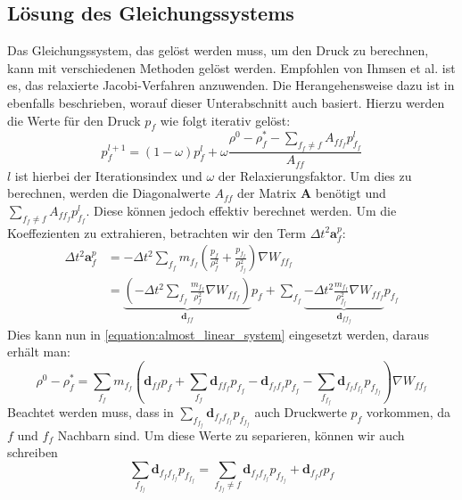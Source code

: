 \documentclass[11pt,
a4paper,
parskip=half, %
BCOR=10mm, %
english,
ngerman]{scrreprt}
\begin{document}
\subsection{Lösung des Gleichungssystems}
Das Gleichungssystem, das gelöst werden muss, um den Druck zu berechnen, kann mit verschiedenen Methoden gelöst werden.
Empfohlen von Ihmsen et al. \cite{ihmsen_implicit_2014} ist es, das relaxierte Jacobi-Verfahren anzuwenden.
Die Herangehensweise dazu ist in \cite{ihmsen_implicit_2014} ebenfalls beschrieben, worauf dieser Unterabschnitt auch basiert.
Hierzu werden die Werte für den Druck $p_f$ wie folgt iterativ gelöst:
\begin{equation}
    \label{equation:iterative_pressure_update}
    p_f^{l+1} = (1 - \omega) p_f^l + \omega \frac{\rho^0 - \rho_f^* - \sum_{f_f \neq f} A_{ff_f} p_{f_f}^l}{A_{ff}}
\end{equation}
$l$ ist hierbei der Iterationsindex und $\omega$ der Relaxierungsfaktor.
Um dies zu berechnen, werden die Diagonalwerte $A_{ff}$ der Matrix $\textbf{A}$ benötigt und $\sum_{f_f \neq f} A_{ff_f} p_{f_f}^l$.
Diese können jedoch effektiv berechnet werden.
Um die Koeffezienten zu extrahieren, betrachten wir den Term $\Delta t^2 \textbf{a}_f^p$:
\begin{align}
    \Delta t^2 \textbf{a}_f^p &= -\Delta t^2 \sum_{f_f} m_{f_f} \left(\frac{p_f}{\rho_f^2} + \frac{p_{f_f}}{\rho_{f_f}^2}\right) \nabla W_{ff_f}\\
        &= \underbrace{\left(-\Delta t^2 \sum_{f_f} \frac{m_{f_f}}{\rho_f^2} \nabla W_{ff_f}\right)}_{\textbf{d}_{ff}} p_f
            + \sum_{f_f} \underbrace{-\Delta t^2 \frac{m_{f_f}}{\rho_{f_f}^2} \nabla W_{ff_f}}_{\textbf{d}_{ff_f}} p_{f_f}
\end{align}
Dies kann nun in \eqref{equation:almost_linear_system} eingesetzt werden, daraus erhält man:
\begin{equation}
    \label{equation:density_difference_not_seperated}
    \rho^0 - \rho_f^* =
     \sum_{f_f} m_{f_f} \left(\textbf{d}_{ff} p_f + \sum_{f_f} \textbf{d}_{ff_f} p_{f_f}
     - \textbf{d}_{f_f f_f} p_{f_f} - \sum_{f_{f_f}} \textbf{d}_{f_f f_{f_f}} p_{f_{f_f}}\right) \nabla W_{ff_f}
\end{equation}
Beachtet werden muss, dass in $\sum_{f_{f_f}} \textbf{d}_{f_f f_{f_f}} p_{f_{f_f}}$ auch Druckwerte $p_f$ vorkommen, da $f$ und $f_f$ Nachbarn sind.
Um diese Werte zu separieren, können wir auch schreiben
\begin{equation}
    \sum_{f_{f_f}} \textbf{d}_{f_f f_{f_f}} p_{f_{f_f}} = \sum_{f_{f_f} \neq f} \textbf{d}_{f_f f_{f_f}} p_{f_{f_f}} + \textbf{d}_{f_f f} p_f
\end{equation}
\end{document}

